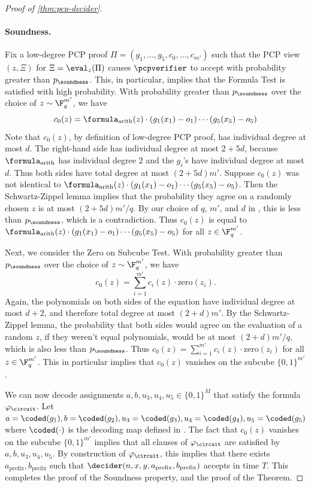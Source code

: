 \begin{proof}[Proof of \cref{thm:pcp-decider}]
\paragraph{Soundness.}
Fix a low-degree PCP proof $\Pi = (g_1,\ldots,g_5,c_0,\ldots,c_{m'})$ such that
the PCP view $(z,\Xi)$ for $\Xi = \eval_z(\Pi)$ causes $\pcpverifier$ to accept
with probability greater than $p_\soundness$.
This, in particular, implies that the Formula Test is satisfied with high
probability.
With probability greater than $p_\soundness$ over the choice of $z \sim
\F_q^{m'}$, we have
\[
  c_0(z) = \formula_{\mathrm{arith}} (z) \cdot (g_1(x_1) - o_1) \cdots (g_5(x_5)- o_5)
\]
Note that $c_0(z)$, by definition of low-degree PCP proof, has individual degree
at most $d$.
The right-hand side has individual degree at most $2 + 5d$, because
$\formula_{\mathrm{arith}}$ has individual degree $2$ and the $g_i$'s have
individual degree at most $d$.
Thus both sides have total degree at most $(2 + 5d)m'$.
Suppose $c_0(z)$ was not identical to $\formula_{\mathrm{arith}} (z) \cdot
(g_1(x_1) - o_1) \cdots (g_5(x_5)- o_5)$.
Then the Schwartz-Zippel lemma implies that the probability they agree on a
randomly chosen $z$ is at most $(2 + 5d)m'/q$.
By our choice of $q$, $m'$, and $d$ in , this is less than
$p_\soundness$, which is a contradiction.
Thus $c_0(z)$ is equal to $\formula_{\mathrm{arith}} (z) \cdot (g_1(x_1) - o_1)
\cdots (g_5(x_5)- o_5)$ for all $z\in \F_q^{m'}$.
    
Next, we consider the Zero on Subcube Test.
With probability greater than $p_\soundness$ over the choice of $z \sim
\F_q^{m'}$, we have
\[
  c_0(z) = \sum_{i=1}^{m'} c_i(z) \cdot \mathrm{zero}(z_i).
\]
Again, the polynomials on both sides of the equation have individual degree at
most $d+2$, and therefore total degree at most $(2 + d)m'$.
By the Schwartz-Zippel lemma, the probability that both sides would agree on the
evaluation of a random $z$, if they weren't equal polynomials, would be at most
$(2 + d)m'/q$, which is also less than $p_\soundness$.
Thus $c_0(z) = \sum_{i=1}^{m'} c_i(z) \cdot \mathrm{zero}(z_i)$ for all $z \in
\F_q^{m'}$.
This in particular implies that $c_0(z)$ vanishes on the subcube $\{0,1\}^{m'}$. 
    
We can now decode assignments $a,b,u_3,u_4,u_5 \in \{0,1\}^M$ that satisfy the
formula $\varphi_\circuit$.
Let $a = \coded(g_1), b = \coded(g_2), u_3 = \coded(g_3), u_4 = \coded(g_4), u_5
= \coded(g_5)$ where $\coded(\cdot)$ is the decoding map defined in
.
The fact that $c_0(z)$ vanishes on the subcube $\{0,1\}^{m'}$ implies that all
clauses of $\varphi_\circuit$ are satisfied by $a,b,u_3,u_4,u_5$.
By construction of $\varphi_\circuit$, this implies that there exists
$a_{\mathrm{prefix}}, b_{\mathrm{prefix}}$ such that
$\decider(n,x,y,a_{\mathrm{prefix}},b_{\mathrm{prefix}})$ accepts in time $T$.
This completes the proof of the Soundness property, and the proof of the
Theorem.
\end{proof}

